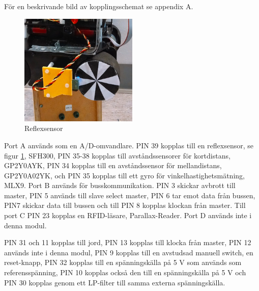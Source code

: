 \documentclass[a4paper,12pt,fleqn]{article}
\begin{document}
För en beskrivande bild av kopplingsschemat se appendix A.

\begin{figure}[htp] %
  \begin{center}
  \includegraphics[keepaspectratio=true,width=0.5\textwidth]{../Kappa/reflexsensor.png}  %
  \end{center}
  \caption{Reflexsensor} %
  \label{fig:reflex} %
\end{figure}

Port A används som en A/D-omvandlare. PIN 39 kopplas till en reflexsensor, se figur \ref{fig:reflex}, SFH300, PIN 35-38 kopplas till avståndssensorer för kortdistans, GP\-2Y\-0A\-YK, 
PIN 34 kopplas till en avståndssensor för mellandistans, GP2Y0A02YK, och PIN 35 kopplas till ett gyro för vinkelhastighetsmätning, ML\-X9. Port B används för busskommunikation. PIN 3 skickar avbrott till master, PIN 5 används till slave select master, PIN 6 tar emot data från bussen, PIN7 skickar data till bussen och till PIN 8 kopplas klockan från master. Till port C PIN 23 kopplas en RFID-läsare, Parallax-Reader. Port D används inte i denna modul. 

PIN 31 och 11 kopplas till jord, PIN 13 kopplas till klocka från master, PIN 12 används inte i denna modul, PIN 9 kopplas till en avstudsad manuell switch, en reset-knapp, PIN 32 kopplas till en spänningskälla på 5 V som används som referensspänning, PIN 10 kopplas också den till en spänningskälla på 5 V och PIN 30 kopplas genom ett LP-filter till samma externa spänningskälla.
\end{document}
